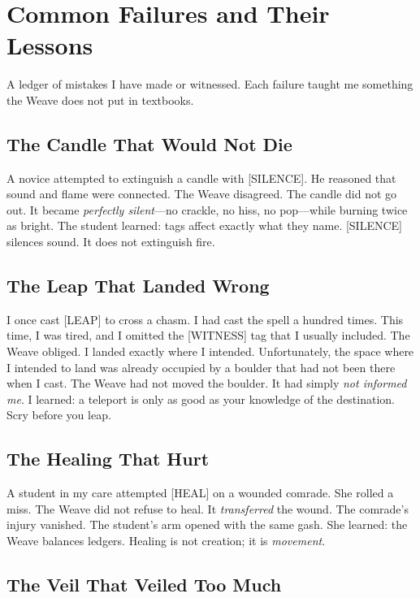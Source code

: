 \chapter{Common Failures and Their Lessons}

A ledger of mistakes I have made or witnessed. Each failure taught me something the Weave does not put in textbooks.

\section{The Candle That Would Not Die}

A novice attempted to extinguish a candle with [SILENCE]. He reasoned that sound and flame were connected. The Weave disagreed. The candle did not go out. It became \emph{perfectly silent}---no crackle, no hiss, no pop---while burning twice as bright. The student learned: tags affect exactly what they name. [SILENCE] silences sound. It does not extinguish fire.

\section{The Leap That Landed Wrong}

I once cast [LEAP] to cross a chasm. I had cast the spell a hundred times. This time, I was tired, and I omitted the [WITNESS] tag that I usually included. The Weave obliged. I landed exactly where I intended. Unfortunately, the space where I intended to land was already occupied by a boulder that had not been there when I cast. The Weave had not moved the boulder. It had simply \emph{not informed me}. I learned: a teleport is only as good as your knowledge of the destination. Scry before you leap.

\section{The Healing That Hurt}

A student in my care attempted [HEAL] on a wounded comrade. She rolled a miss. The Weave did not refuse to heal. It \emph{transferred} the wound. The comrade's injury vanished. The student's arm opened with the same gash. She learned: the Weave balances ledgers. Healing is not creation; it is \emph{movement}.

\section{The Veil That Veiled Too Much}

